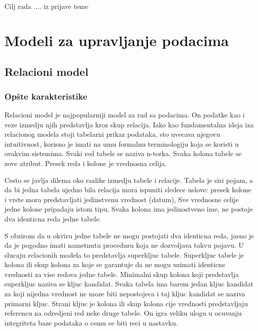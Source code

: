 \documentclass[12pt,oneside]{memoir}
\begin{document}
Cilj rada .... iz prijave teme

\cite{PostgresHistory}


\chapter{Modeli za upravljanje podacima}
\label{chp:razrada}
\section{Relacioni model}
\subsection{Opšte karakteristike}
Relacioni model je najpopularniji model za rad sa podacima. On podatke kao i veze izmedju njih predstavlja kroz skup relacija. Iako kao fundamentalna ideja iza relacionog modela stoji tabelarni prikaz podataka, sto uvecava njegovu intuitivnost, korisno je imati na umu formalnu terminologiju koja se koristi u ovakvim sistemima. Svaki red tabele se naziva n-torka. Svaka kolona tabele se zove atribut. Presek reda i kolone je vrednosna celija.

Cesto se javlja dilema oko razlike izmedju tabele i relacije. Tabela je siri pojam, a da bi jedna tabela ujedno bila relacija mora ispuniti sledece uslove: presek kolone i vrste mora predstavljati jedinstvenu vrednost (datum), Sve vrednosne celije jedne kolone pripadaju istom tipu, Svaka kolona ima jedinostveno ime, ne postoje dva identicna reda jedne tabele.

S obzirom da u okviru jedne tabele ne mogu postojati dva identicna reda, jasno je da je pogodno imati nametnutu proceduru koja ne dozvoljava takvu pojavu. U slucaju relacionih modela to predstavlja superkljuc tabele. Superkljuc tabele je kolona ili skup kolona za koje se garantuje da ne mogu uzimati identicne vrednosti za vise redova jedne tabele. Minimalni skup kolona koji predstavlja superkljuc naziva se kljuc kandidat. Svaka tabela ima barem jedan kljuc kandidat za koji nijedna vrednost ne moze biti nepostojeca i taj kljuc kandidat se naziva primarni kljuc. Strani kljuc je kolona ili skup kolona cije vrednosti predstavljaju referencu na odredjeni red neke druge tabele. On igra veliku ulogu u ocuvanju integriteta baze podataka o cemu ce biti reci u nastavku.
\end{document}
